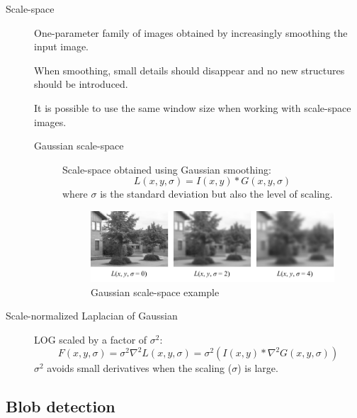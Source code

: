 \begin{description}
    \item[Scale-space] 
        One-parameter family of images obtained by increasingly smoothing the input image.

        \begin{remark}
            When smoothing, small details should disappear and no new structures should be introduced.            
        \end{remark}

        \begin{remark}
            It is possible to use the same window size when working with scale-space images.
        \end{remark}

        \begin{description}
            \item[Gaussian scale-space] 
                Scale-space obtained using Gaussian smoothing:
                \[ L(x, y, \sigma) = I(x, y) * G(x, y, \sigma) \]
                where $\sigma$ is the standard deviation but also the level of scaling.

                \begin{figure}[H]
                    \centering
                    \includegraphics[width=0.8\linewidth]{./img/_scale_space_example.pdf}
                    \caption{Gaussian scale-space example}
                \end{figure}
        \end{description}

    \item[Scale-normalized Laplacian of Gaussian] 
        LOG scaled by a factor of $\sigma^2$:
        \[ F(x, y, \sigma) = \sigma^2 \nabla^2 L(x, y, \sigma) = \sigma^2 (I(x, y) * \nabla^2 G(x, y, \sigma)) \]
        $\sigma^2$ avoids small derivatives when the scaling ($\sigma$) is large.
\end{description}


\subsection{Blob detection}

